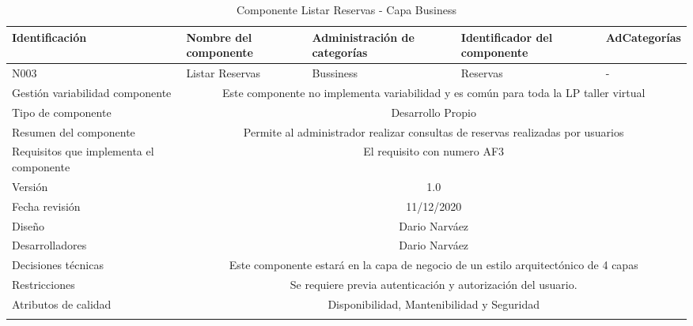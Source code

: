 \documentclass[10pt,a4paper,openany]{book}
\begin{document}
\begin{longtable}{|p{3cm}|p{3cm}|p{3cm}|p{3cm}|p{3cm}|} \hline
Identificación & Nombre del componente & Administración de categorías & Identificador del componente & AdCategorías \\[0.5ex] \hline
N003& Listar Reservas& Bussiness& Reservas& -\\[0.5ex] \hline
Gestión variabilidad componente & \multicolumn{4}{|c|}{Este componente no implementa variabilidad y es común para toda la LP taller virtual} \\ \hline
Tipo de componente & \multicolumn{4}{|c|}{Desarrollo Propio} \\ \hline
Resumen del componente & \multicolumn{4}{|c|}{Permite al administrador realizar consultas de reservas realizadas por usuarios} \\ \hline
Requisitos que implementa el componente & \multicolumn{4}{|c|}{El requisito con numero AF3 } \\ \hline
Versión & \multicolumn{4}{|c|}{1.0 } \\ \hline
Fecha revisión & \multicolumn{4}{|c|}{ 11/12/2020} \\ \hline
Diseño & \multicolumn{4}{|c|}{Dario Narváez} \\ \hline
Desarrolladores & \multicolumn{4}{|c|}{Dario Narváez} \\ \hline
Decisiones técnicas & \multicolumn{4}{|c|}{Este componente estará en la capa de negocio de un estilo arquitectónico de 4 capas  } \\ \hline
Restricciones & \multicolumn{4}{|c|}{Se requiere previa autenticación y autorización del usuario.} \\ \hline
Atributos de calidad & \multicolumn{4}{|c|}{Disponibilidad, Mantenibilidad y Seguridad} \\ \hline
\caption{Componente Listar Reservas - Capa Business}
\label{table:t6}
\end{longtable}
\end{document}

